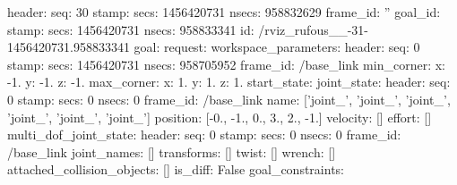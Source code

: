 header\-: seq\-: 30 stamp\-: secs\-: 1456420731 nsecs\-: 958832629 frame\-\_\-id\-: '' goal\-\_\-id\-: stamp\-: secs\-: 1456420731 nsecs\-: 958833341 id\-: /rviz\-\_\-rufous\-\_\-\_-\/31-\/1456420731.958833341 goal\-: request\-: workspace\-\_\-parameters\-: header\-: seq\-: 0 stamp\-: secs\-: 1456420731 nsecs\-: 958705952 frame\-\_\-id\-: /base\-\_\-link min\-\_\-corner\-: x\-: -\/1. y\-: -\/1. z\-: -\/1. max\-\_\-corner\-: x\-: 1. y\-: 1. z\-: 1. start\-\_\-state\-: joint\-\_\-state\-: header\-: seq\-: 0 stamp\-: secs\-: 0 nsecs\-: 0 frame\-\_\-id\-: /base\-\_\-link name\-: \mbox{[}'joint\-\_', 'joint\-\_', 'joint\-\_', 'joint\-\_', 'joint\-\_', 'joint\-\_'\mbox{]} position\-: \mbox{[}-\/0., -\/1., 0., 3., 2., -\/1.\mbox{]} velocity\-: \mbox{[}\mbox{]} effort\-: \mbox{[}\mbox{]} multi\-\_\-dof\-\_\-joint\-\_\-state\-: header\-: seq\-: 0 stamp\-: secs\-: 0 nsecs\-: 0 frame\-\_\-id\-: /base\-\_\-link joint\-\_\-names\-: \mbox{[}\mbox{]} transforms\-: \mbox{[}\mbox{]} twist\-: \mbox{[}\mbox{]} wrench\-: \mbox{[}\mbox{]} attached\-\_\-collision\-\_\-objects\-: \mbox{[}\mbox{]} is\-\_\-diff\-: False goal\-\_\-constraints\-:
